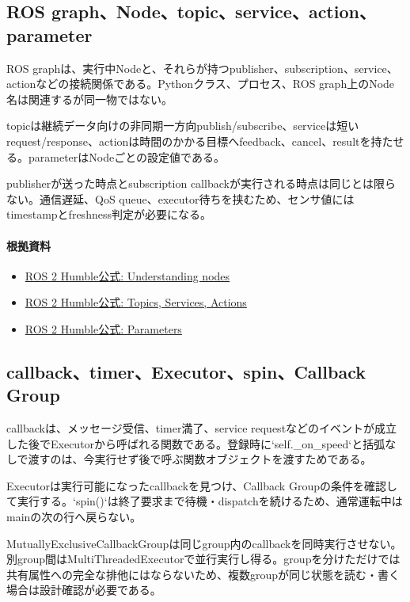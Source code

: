 \documentclass[a4paper,11pt]{article}
\begin{document}
\subsection{ROS graph、Node、topic、service、action、parameter}
ROS graphは、実行中Nodeと、それらが持つpublisher、subscription、service、actionなどの接続関係である。Pythonクラス、プロセス、ROS graph上のNode名は関連するが同一物ではない。


topicは継続データ向けの非同期一方向publish/subscribe、serviceは短いrequest/response、actionは時間のかかる目標へfeedback、cancel、resultを持たせる。parameterはNodeごとの設定値である。


publisherが送った時点とsubscription callbackが実行される時点は同じとは限らない。通信遅延、QoS queue、executor待ちを挟むため、センサ値にはtimestampとfreshness判定が必要になる。

\paragraph{根拠資料}
\begin{itemize}[leftmargin=1.6em]
\item \href{https://docs.ros.org/en/humble/Tutorials/Beginner-CLI-Tools/Understanding-ROS2-Nodes/Understanding-ROS2-Nodes.html}{ROS 2 Humble公式: Understanding nodes}
\item \href{https://docs.ros.org/en/humble/Concepts/Basic/Interfaces-Topics-Services-Actions.html}{ROS 2 Humble公式: Topics, Services, Actions}
\item \href{https://docs.ros.org/en/humble/Concepts/Basic/About-Parameters.html}{ROS 2 Humble公式: Parameters}
\end{itemize}

\subsection{callback、timer、Executor、spin、Callback Group}
callbackは、メッセージ受信、timer満了、service requestなどのイベントが成立した後でExecutorから呼ばれる関数である。登録時に`self.\_on\_speed`と括弧なしで渡すのは、今実行せず後で呼ぶ関数オブジェクトを渡すためである。


Executorは実行可能になったcallbackを見つけ、Callback Groupの条件を確認して実行する。`spin()`は終了要求まで待機・dispatchを続けるため、通常運転中はmainの次の行へ戻らない。


MutuallyExclusiveCallbackGroupは同じgroup内のcallbackを同時実行させない。別group間はMultiThreadedExecutorで並行実行し得る。groupを分けただけでは共有属性への完全な排他にはならないため、複数groupが同じ状態を読む・書く場合は設計確認が必要である。
\end{document}
